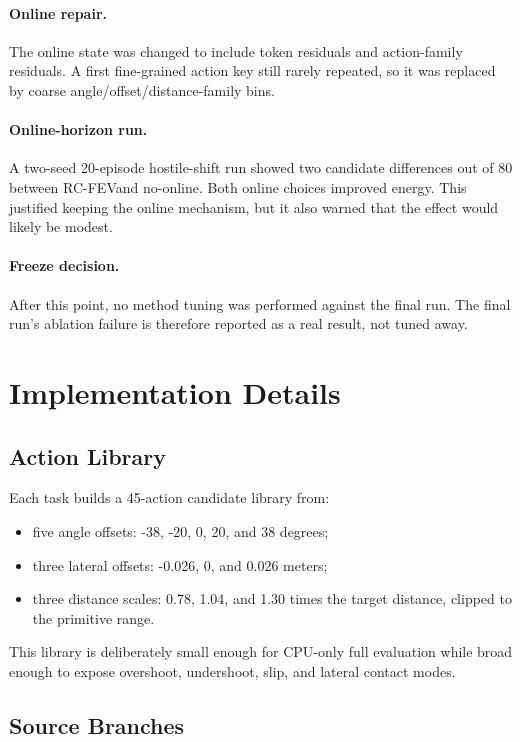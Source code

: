 \documentclass{article}
\newcommand{\method}{RC-FEV}
\begin{document}
\paragraph{Online repair.}
The online state was changed to include token residuals and action-family residuals. A first fine-grained action key still rarely repeated, so it was replaced by coarse angle/offset/distance-family bins.

\paragraph{Online-horizon run.}
A two-seed 20-episode hostile-shift run showed two candidate differences out of 80 between \method and no-online. Both online choices improved energy. This justified keeping the online mechanism, but it also warned that the effect would likely be modest.

\paragraph{Freeze decision.}
After this point, no method tuning was performed against the final run. The final run's ablation failure is therefore reported as a real result, not tuned away.

\section{Implementation Details}

\subsection{Action Library}

Each task builds a 45-action candidate library from:

\begin{itemize}
\item five angle offsets: -38, -20, 0, 20, and 38 degrees;
\item three lateral offsets: -0.026, 0, and 0.026 meters;
\item three distance scales: 0.78, 1.04, and 1.30 times the target distance, clipped to the primitive range.
\end{itemize}

This library is deliberately small enough for CPU-only full evaluation while broad enough to expose overshoot, undershoot, slip, and lateral contact modes.

\subsection{Source Branches}
\end{document}
